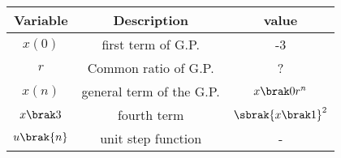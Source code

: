   \begin{tabular}{|c|c|c|}
    \hline
    \textbf{Variable} & \textbf{Description} & \textbf{value}\\
    \hline
    $x(0)$ & first term of G.P. & -3 \\
    \hline
    $r$ & Common ratio of G.P. & ? \\
    \hline
    $x(n)$ & general term of the G.P. & $x\brak0r^{n}$ \\
    \hline
    $x\brak3$ & fourth term & $\sbrak{x\brak1}^2$\\
    \hline
    $u\brak{n}$ & unit step function & - \\
    \hline
  \end{tabular}
